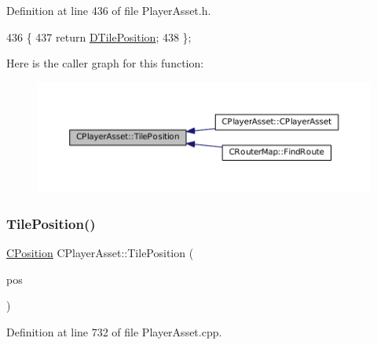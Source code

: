 Definition at line 436 of file Player\+Asset.\+h.


\begin{DoxyCode}
436                                       \{
437             \textcolor{keywordflow}{return} \hyperlink{classCPlayerAsset_a5b59a9d3b7db8c7fa194b80dafb96186}{DTilePosition};  
438         \};
\end{DoxyCode}
Here is the caller graph for this function\+:
\nopagebreak
\begin{figure}[H]
\begin{center}
\leavevmode
\includegraphics[width=350pt]{classCPlayerAsset_a23354232e5585574bc8e12c1fdb37ad9_icgraph}
\end{center}
\end{figure}
\hypertarget{classCPlayerAsset_a6d84105b6db136a6846fcaf80dba3747}{}\label{classCPlayerAsset_a6d84105b6db136a6846fcaf80dba3747} 
\subsubsection{\texorpdfstring{Tile\+Position()}{TilePosition()}\hspace{0.1cm}{\footnotesize\ttfamily [2/2]}}
{\footnotesize\ttfamily \hyperlink{classCPosition}{C\+Position} C\+Player\+Asset\+::\+Tile\+Position (\begin{DoxyParamCaption}\item[{const \hyperlink{classCPosition}{C\+Position} \&}]{pos }\end{DoxyParamCaption})}



Definition at line 732 of file Player\+Asset.\+cpp.


